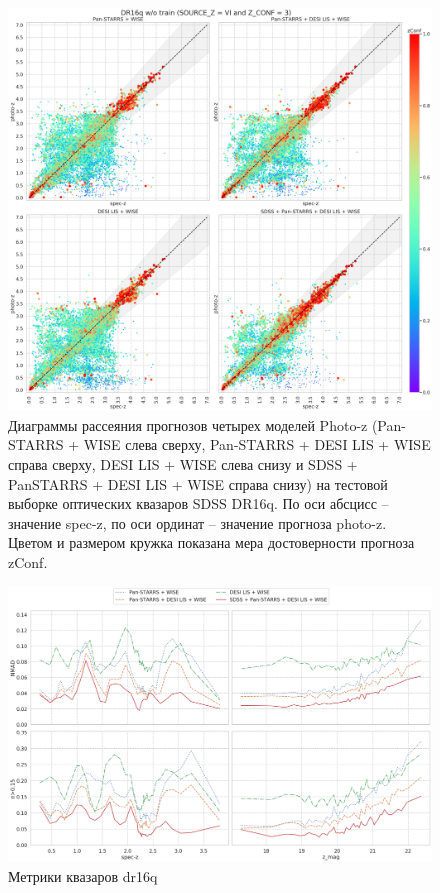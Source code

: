 \documentclass[fleqn,usenatbib]{mnras}
\begin{document}
\begin{figure}
    \centering
    \includegraphics[width=0.9\linewidth]{images/scatterplots-dr16q-wo-train.png}
    \caption{Диаграммы рассеяния прогнозов четырех моделей Photo-z (Pan-STARRS + WISE слева сверху, Pan-STARRS + DESI LIS + WISE справа сверху, DESI LIS + WISE слева снизу и SDSS + PanSTARRS + DESI LIS + WISE справа снизу) на тестовой выборке оптических квазаров SDSS DR16q. По оси абсцисс -- значение spec-z, по оси ординат -- значение прогноза photo-z. Цветом и размером кружка показана мера достоверности прогноза zConf.}
    \label{fig:dr16q_wo_train}
\end{figure}

\begin{figure}
    \centering
    \includegraphics[width=0.9\linewidth]{images/metrics-dr16q.png}
    \caption{Метрики квазаров dr16q}
    \label{fig:metrics-cv2-gal}
\end{figure}
\end{document}
